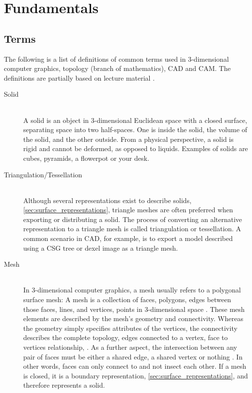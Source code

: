 \chapter{Fundamentals} %
\label{ch:fundamentals}

\section{Terms}
\label{sec:definitions}

The following is a list of definitions of common terms used in 3-dimensional computer graphics, topology (branch of mathematics), CAD and CAM. The definitions are partially based on lecture material \cite{mesh_basics, mesh_lecture10}.

\begin{description}

	\item[Solid] \hfill \\
	A solid is an object in 3-dimensional Euclidean space with a closed surface, separating space into two half-spaces.
	One is inside the solid, the volume of the solid, and the other outside.
	From a physical perspective, a solid is rigid and cannot be deformed, as opposed to \eg liquids.
	Examples of solids are cubes, pyramids, a flowerpot or your desk.


	\item[Triangulation/Tessellation] \hfill \\
	Although several representations exist to describe solids, \cf \cref{sec:surface_representations}, triangle meshes are often preferred when exporting or distributing a solid.
	The process of converting an alternative representation to a triangle mesh is called triangulation or tessellation.
	A common scenario in CAD, for example, is to export a model described using a CSG tree or dexel image as a triangle mesh.




	\item[Mesh] \hfill \\
	In 3-dimensional computer graphics, a mesh usually refers to a polygonal surface mesh:
	A mesh is a collection of faces, \ie polygons, edges between those faces, \ie lines, and vertices, \ie points in 3-dimensional space \cite{mesh_basics}.
	These mesh elements are described by the mesh's geometry and connectivity.
	Whereas the geometry simply specifies attributes of the vertices, the connectivity describes the complete topology, \eg edges connected to a vertex, face to vertices relationship, \etc.
	As a further aspect, the intersection between any pair of faces must be either a shared edge, a shared vertex or nothing \cite{mesh_lecture10}.
	In other words, faces can only connect to and not insect each other.
	If a mesh is closed, it is a boundary representation, \cf \cref{sec:surface_representations}, and therefore represents a solid.


\end{description}
